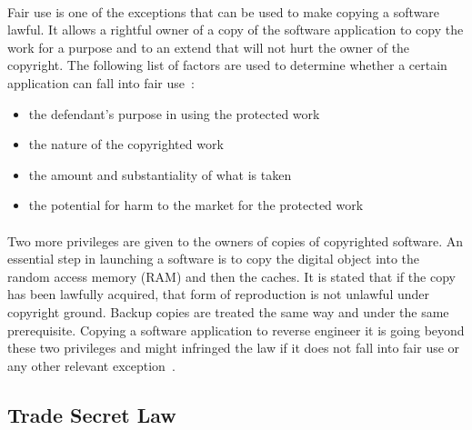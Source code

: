 \paragraph{}
Fair use is one of the exceptions that can be used to make copying a software lawful. It allows a rightful owner of a copy of the software application to copy the work for a purpose and to an extend that will not hurt the owner of the copyright. The following list of factors are used to determine whether a certain application can fall into fair use~\cite{litman1992copyright}:
\begin{itemize}
	\item the defendant's purpose in using the protected work
	\item the nature of the copyrighted work
	\item the amount and substantiality of what is taken
	\item the potential for harm to the market for the protected work
\end{itemize}

\paragraph{}
Two more privileges are given to the owners of copies of copyrighted software. An essential step in launching a software is to copy the digital object into the random access memory (RAM) and then the caches. It is stated that if the copy has been lawfully acquired, that form of reproduction is not unlawful under copyright ground. Backup copies are treated the same way and under the same prerequisite. Copying a software application to reverse engineer it is going beyond these two privileges and might infringed the law if it does not fall into fair use or any other relevant exception~\cite{samuelson1990reverse}.

\subsection{Trade Secret Law}
